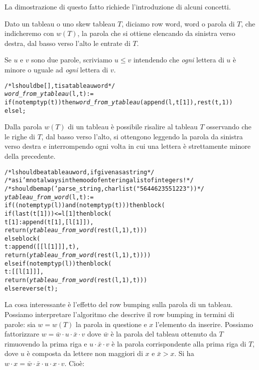 La dimostrazione di questo fatto richiede l'introduzione di alcuni
concetti.

\begin{defn}[Parola]
Dato un tableau o uno skew tableau $T$, diciamo row word, word o parola
di $T$, che indicheremo con $w(T)$, la parola che si ottiene elencando
da sinistra verso destra, dal basso verso l'alto le entrate di $T$.

\begin{notaz}
Se $u$ e $v$ sono due parole, scriviamo $u \leq v$ intendendo che
\emph{ogni} lettera di $u$ \`e minore o uguale ad \emph{ogni} lettera
di $v$.
\end{notaz}

\begin{alltt}
/* l should be [], t is a tableau word */
\emph{word\_from\_ytableau} (l, t) :=
if (not emptyp (t)) then \emph{word\_from\_ytableau} (append (l, t[1]), rest (t, 1))
else l;
\end{alltt}
\end{defn}

\begin{oss}
Dalla parola $w(T)$ di un tableau \`e possibile risalire al tableau
$T$ osservando che le righe di $T$, dal basso verso l'alto, si
ottengono leggendo la parola da sinistra verso destra e interrompendo
ogni volta in cui una lettera \`e strettamente minore della
precedente.
\begin{alltt}
/* l should be a tableau word, if given as a string */
/* as i'm not always in the mood of entering a list of integers! */
/* should be map ('parse_string, charlist ("5644623551223")) */
\emph{ytableau\_from\_word} (l,t) :=
if ((not emptyp (l)) and (not emptyp (t))) then block (
  if (last (t[1])) <= l[1] then block (
    t[1] : append (t[1], [l[1]]),
    return (\emph{ytableau\_from\_word} (rest (l, 1), t)))
  else block (
    t : append ([[l[1]]], t),
    return (\emph{ytableau\_from\_word} (rest (l, 1), t))))
else if (not emptyp (l)) then block (
  t : [[l[1]]],
  return (\emph{ytableau\_from\_word} (rest (l, 1), t)))
else reverse (t);
\end{alltt}
\end{oss}

La cosa interessante \`e l'effetto del row bumping sulla
parola di un tableau. 
Possiamo interpretare l'algoritmo che descrive
il row bumping in termini di parole: sia $w = w(T)$ la parola in questione e
$x$ l'elemento da inserire. Possiamo fattorizzare $w=\bar w \cdot u \cdot \bar x \cdot
v$ dove $\bar w$ \`e la parola del tableau ottenuto da $T$ rimuovendo
la prima riga e $u \cdot \bar x \cdot v$ \`e la parola corrispondente
alla prima riga di $T$, dove $u$ \`e composta da lettere non maggiori
di $x$ e $\bar x > x$. Si ha $w \cdot x = \bar w \cdot \bar x \cdot u \cdot x
\cdot v$. Cio\`e:

